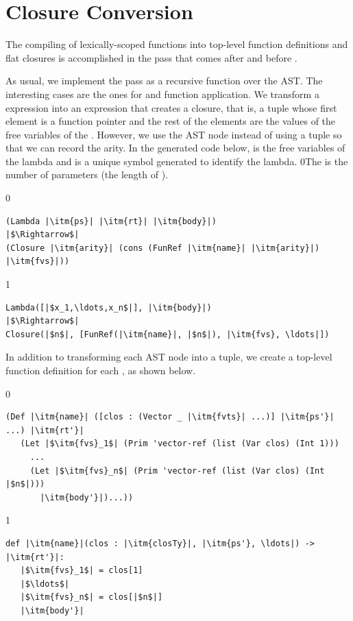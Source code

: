 \documentclass[7x10]{TimesAPriori_MIT}%
\def\racketEd{0}
\def\pythonEd{1}
\def\edition{0}
\newcommand{\racket}[1]{{\if\edition\racketEd{#1}\fi}}
\numberwithin{theorem}{chapter}
\numberwithin{definition}{chapter}
\numberwithin{equation}{chapter}
\begin{document}
\section{Closure Conversion}
\label{sec:closure-conversion}

The compiling of lexically-scoped functions into top-level function
definitions and flat closures is accomplished in the pass
 that comes after 
and before .

As usual, we implement the pass as a recursive function over the
AST. The interesting cases are the ones for  and function
application. We transform a  expression into an expression
that creates a closure, that is, a tuple whose first element is a
function pointer and the rest of the elements are the values of the
free variables of the .
%
However, we use the  AST node instead of using a tuple
so that we can record the arity.
%
In the generated code below,  is the free variables of the
lambda and  is a unique symbol generated to identify the lambda.
%
\racket{The  is the number of parameters (the length of
  \itm{ps}).}
%
{\if\edition\racketEd
\begin{lstlisting}
(Lambda |\itm{ps}| |\itm{rt}| |\itm{body}|)
|$\Rightarrow$|
(Closure |\itm{arity}| (cons (FunRef |\itm{name}| |\itm{arity}|) |\itm{fvs}|))
\end{lstlisting}
\fi}
%
{\if\edition\pythonEd
\begin{lstlisting}
Lambda([|$x_1,\ldots,x_n$|], |\itm{body}|)
|$\Rightarrow$|
Closure(|$n$|, [FunRef(|\itm{name}|, |$n$|), |\itm{fvs}, \ldots|])
\end{lstlisting}
\fi}
%
In addition to transforming each  AST node into a
tuple, we create a top-level function definition for each
, as shown below.\\
\begin{minipage}{0.8\textwidth}
{\if\edition\racketEd
\begin{lstlisting}
(Def |\itm{name}| ([clos : (Vector _ |\itm{fvts}| ...)] |\itm{ps'}| ...) |\itm{rt'}|
   (Let |$\itm{fvs}_1$| (Prim 'vector-ref (list (Var clos) (Int 1)))
     ...
     (Let |$\itm{fvs}_n$| (Prim 'vector-ref (list (Var clos) (Int |$n$|)))
       |\itm{body'}|)...))
\end{lstlisting}
\fi}
{\if\edition\pythonEd
\begin{lstlisting}
def |\itm{name}|(clos : |\itm{closTy}|, |\itm{ps'}, \ldots|) -> |\itm{rt'}|:
   |$\itm{fvs}_1$| = clos[1]
   |$\ldots$|
   |$\itm{fvs}_n$| = clos[|$n$|]
   |\itm{body'}|
\end{lstlisting}
\fi}
\end{minipage}\\
\end{document}
